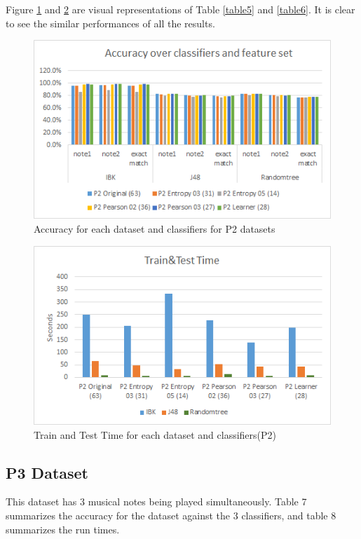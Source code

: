 \documentclass{article}
\begin{document}
Figure \ref{figure4} and \ref{figure5} are visual representations of Table \ref{table5} and \ref{table6}. It is clear to see the similar performances of all the results.

\begin{figure}[h]
\includegraphics[scale=.65]{accuracy_p2}
 \caption{Accuracy for each dataset and classifiers for P2 datasets}
\label{figure4}
\end{figure}

\begin{figure}[h]
\includegraphics[scale=.65]{time_p2}
 \caption{Train and Test Time for each dataset and classifiers(P2)}
\label{figure5}
\end{figure}




\subsection{P3 Dataset}
This dataset has 3 musical notes being played simultaneously. Table 7 summarizes the accuracy for the dataset against the 3 classifiers, and table 8 summarizes the run times.
\end{document}
